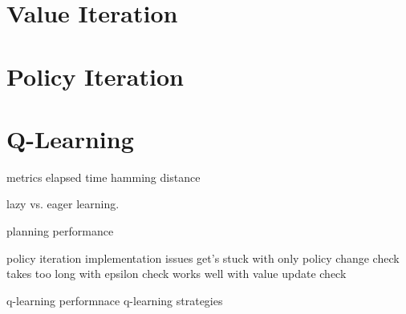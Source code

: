 \documentclass{sig-alternate}
\begin{document}
\section{Value Iteration}


\section{Policy Iteration}

\section{Q-Learning}

metrics
    elapsed time
    hamming distance

lazy vs. eager learning.

planning performance

policy iteration implementation issues
    get's stuck with only policy change check
    takes too long with epsilon check
    works well with value update check


q-learning performnace
q-learning strategies










\end{document}
